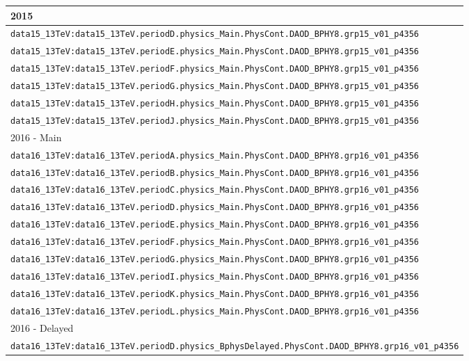 \begin{table}[!hbp]
\centering
\footnotesize
\begin{tabular}{|l|}
\hline
2015 \\
\hline
\verb|data15_13TeV:data15_13TeV.periodD.physics_Main.PhysCont.DAOD_BPHY8.grp15_v01_p4356| \\
\verb|data15_13TeV:data15_13TeV.periodE.physics_Main.PhysCont.DAOD_BPHY8.grp15_v01_p4356| \\
\verb|data15_13TeV:data15_13TeV.periodF.physics_Main.PhysCont.DAOD_BPHY8.grp15_v01_p4356| \\
\verb|data15_13TeV:data15_13TeV.periodG.physics_Main.PhysCont.DAOD_BPHY8.grp15_v01_p4356| \\
\verb|data15_13TeV:data15_13TeV.periodH.physics_Main.PhysCont.DAOD_BPHY8.grp15_v01_p4356| \\
\verb|data15_13TeV:data15_13TeV.periodJ.physics_Main.PhysCont.DAOD_BPHY8.grp15_v01_p4356| \\
\hline 
2016 - Main  \\
\hline 
\verb|data16_13TeV:data16_13TeV.periodA.physics_Main.PhysCont.DAOD_BPHY8.grp16_v01_p4356| \\
\verb|data16_13TeV:data16_13TeV.periodB.physics_Main.PhysCont.DAOD_BPHY8.grp16_v01_p4356| \\
\verb|data16_13TeV:data16_13TeV.periodC.physics_Main.PhysCont.DAOD_BPHY8.grp16_v01_p4356| \\
\verb|data16_13TeV:data16_13TeV.periodD.physics_Main.PhysCont.DAOD_BPHY8.grp16_v01_p4356| \\
\verb|data16_13TeV:data16_13TeV.periodE.physics_Main.PhysCont.DAOD_BPHY8.grp16_v01_p4356| \\
\verb|data16_13TeV:data16_13TeV.periodF.physics_Main.PhysCont.DAOD_BPHY8.grp16_v01_p4356| \\
\verb|data16_13TeV:data16_13TeV.periodG.physics_Main.PhysCont.DAOD_BPHY8.grp16_v01_p4356| \\
\verb|data16_13TeV:data16_13TeV.periodI.physics_Main.PhysCont.DAOD_BPHY8.grp16_v01_p4356| \\
\verb|data16_13TeV:data16_13TeV.periodK.physics_Main.PhysCont.DAOD_BPHY8.grp16_v01_p4356| \\
\verb|data16_13TeV:data16_13TeV.periodL.physics_Main.PhysCont.DAOD_BPHY8.grp16_v01_p4356| \\
\hline  
2016 - Delayed \\
\hline  
\verb|data16_13TeV:data16_13TeV.periodD.physics_BphysDelayed.PhysCont.DAOD_BPHY8.grp16_v01_p4356| \\

\end{tabular}
\end{table}
